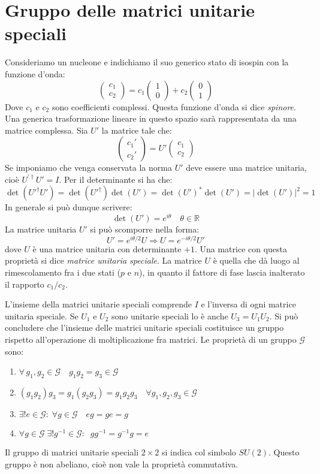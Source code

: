 \section{Gruppo delle matrici unitarie speciali}
Consideriamo un nucleone e indichiamo il suo generico stato di isospin con la funzione d'onda:
\[
\begin{pmatrix}
c_1\\
c_2
\end{pmatrix}
=c_1
\begin{pmatrix}
1\\
0
\end{pmatrix}
+c_2
\begin{pmatrix}
0\\
1
\end{pmatrix}
\]
Dove $c_1$ e $c_2$ sono coefficienti complessi. Questa funzione d'onda si dice
\textit{spinore}. Una generica trasformazione lineare in questo spazio sarà
rappresentata da una matrice complessa.
Sia $U'$ la matrice tale che:
\[
\begin{pmatrix}
c_1'\\
c_2'
\end{pmatrix}
=U'
\begin{pmatrix}
c_1\\
c_2
\end{pmatrix}
\]
Se imponiamo che venga conservata la norma $U'$ deve essere una matrice
unitaria, cioè $U^{'\dagger}U'=I$.
Per il determinante si ha che:
\[
\det(U'^{\dagger}U')=\det(U'^{\dagger})\det(U')=\det(U')^*\det(U')=|\det(U')|^2=1
\]
In generale si può dunque scrivere:
\[
\det(U')=e^{i\theta}\quad\theta\in\mathbb{R}
\]
La matrice unitaria $U'$ si può scomporre nella forma:
\begin{equation}
U'=e^{i\theta/2}U\Rightarrow U=e^{-i\theta/2}U'
\end{equation}
dove $U$ è una matrice unitaria con determinante $+1$. Una matrice con questa
proprietà si dice \textit{matrice unitaria speciale}.
La matrice $U$ è quella che dà luogo al rimescolamento fra i due stati ($p$ e
$n$), in quanto il fattore di fase lascia inalterato il rapporto $c_1/c_2$.

L'insieme della matrici unitarie speciali comprende $I$ e l'inversa di ogni
matrice unitaria speciale. Se $U_1$ e $U_2$ sono unitarie speciali lo è anche
$U_3=U_1U_2$.
Si può concludere che l'insieme delle matrici unitarie speciali costituisce un
gruppo rispetto all'operazione di moltiplicazione fra matrici. Le proprietà di
un gruppo $\mathscr{G}$ sono:
\begin{enumerate}
\item $\forall\,g_1,g_2\in\mathscr{G}\quad g_1g_2=g_3\in\mathscr{G}$
\item $(g_1g_2)g_3=g_1(g_2g_3)=g_1g_2g_3\quad\forall g_1,g_2,g_3\in\mathscr{G}$
\item $\exists !e\in\mathscr{G}:\;\forall g\in\mathscr{G}\quad eg=ge=g$
\item $\forall g\in\mathscr{G}\;\exists !g^{-1}\in\mathscr{G}:\;\;gg^{-1}=g^{-1}g=e$
\end{enumerate}
Il gruppo di matrici unitarie speciali $2\times 2$ si indica col simbolo
$SU(2)$. Questo gruppo è non abeliano, cioè non vale la proprietà commutativa.

